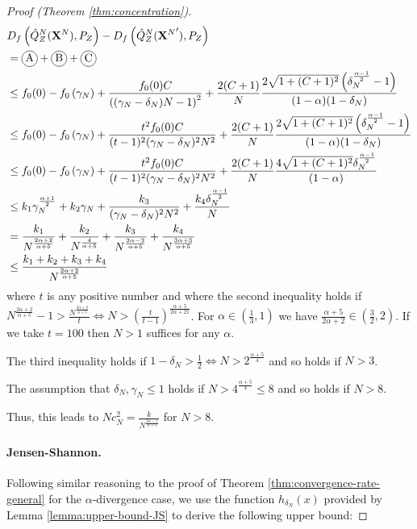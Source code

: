 \begin{proof}[Proof (Theorem \ref{thm:concentration})]
\begin{align*}
    &D_f\left( \hat{Q}_Z^N(\XN) , P_Z\right) - D_f\left( \hat{Q}_Z^N({\XN}') , P_Z\right) \\
    &= \encircle{A} + \encircle{B} + \encircle{C} \\
    &\leq f_0(0) - f_0\left(\gamma_N\right) + \frac{f_0(0)C}{\left((\gamma_N-\delta_N)N - 1\right)^2} + \frac{2(C+1)}{N}\frac{2\sqrt{1+(C+1)^2}\left(\delta_N^\frac{\alpha-1}{2} - 1\right)}{(1-\alpha) (1-\delta_N)} \\
    &\leq f_0(0) - f_0\left(\gamma_N\right) + \frac{t^2f_0(0)C}{(t-1)^2(\gamma_N-\delta_N)^2N^2} + \frac{2(C+1)}{N}\frac{2\sqrt{1+(C+1)^2}\left(\delta_N^\frac{\alpha-1}{2} - 1\right)}{(1-\alpha) (1-\delta_N)} \\
    &\leq f_0(0) - f_0\left(\gamma_N\right) + \frac{t^2f_0(0)C}{(t-1)^2(\gamma_N-\delta_N)^2N^2} + \frac{2(C+1)}{N}\frac{4\sqrt{1+(C+1)^2}\delta_N^\frac{\alpha-1}{2}}{(1-\alpha)} \\
    &\leq k_1 \gamma_N^{\frac{\alpha+1}{2}} + k_2 \gamma_N +\frac{k_3}{(\gamma_N-\delta_N)^2N^2} + \frac{k_4 \delta_N^\frac{\alpha-1}{2}}{N} \\
    &= \frac{k_1}{N^{\frac{2\alpha+2}{\alpha+5}}} + \frac{k_2}{N^\frac{4}{\alpha+5}} + \frac{k_3}{N^{\frac{2\alpha -2}{\alpha+5}}} +\frac{k_4}{N^{\frac{3\alpha+3}{\alpha+5}}} \\
    &\leq \frac{k_1+k_2+k_3 + k_4}{N^{\frac{2\alpha+2}{\alpha+5}}}
\end{align*}
where $t$ is any positive number and where the second inequality holds if $N^\frac{2\alpha+2}{\alpha+5} - 1 > \frac{N^\frac{2\alpha+2}{\alpha+5}}{t} \iff N > (\frac{t}{t-1})^{\frac{\alpha+5}{2\alpha+21}}$.
For $\alpha \in (\frac{1}{3}, 1)$ we have $\frac{\alpha+5}{2\alpha+2} \in (\frac{3}{2}, 2)$. 
If we take $t=100$ then $N> 1$ suffices for any $\alpha$.

The third inequality holds if $1-\delta_N > \frac{1}{2} \iff N>2^\frac{\alpha+5}{4}$ and so holds if $N>3$.

The assumption that $\delta_N, \gamma_N \leq 1$ holds if $N>4^\frac{\alpha+5}{4}\leq8$ and so holds if $N>8$.

Thus, this leads to $Nc_N^2 = \frac{k}{N^{\frac{3\alpha - 1}{\alpha+5}}}$ for $N>8$.


\paragraph{Jensen-Shannon.}

Following similar reasoning to the proof of Theorem \ref{thm:convergence-rate-general} for the $\alpha$-divergence case, we use the function $h_{\delta_N}(x)$ provided by Lemma \ref{lemma:upper-bound-JS} to derive the following upper bound:



\end{proof}

